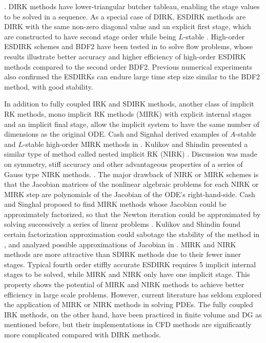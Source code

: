 \cite{wang2017compact_VR}.
DIRK methods have lower-triangular butcher tableau,
enabling the stage values to be solved in a sequence.
As a special case of DIRK,
ESDIRK methods are DIRK with the same non-zero diagonal value
and an explicit first stage,
which are constructed to have
second stage order while being $L$-stable
\cite{kennedy2003additiveARK,kvaerno2004singly}.
High-order ESDIRK schemes and
BDF2 have been tested in
\cite{bijl2002implicitBDFvESDIRK,wang2007implicitDGTests}
to solve flow problems,
whose results illustrate
better accuracy and higher efficiency
of high-order ESDIRK methods
compared to the second order BDF2.
Previous numerical experiments also confirmed
the ESDIRKs can endure large time step size similar to the BDF2 method,
with good stability.


In addition to fully coupled IRK and SDIRK methods,
another class of implicit RK methods,
mono implicit RK methods (MIRK)
\cite{cash1975classMIRKOrig}
with explicit internal stages and
an implicit final stage,
allow the implicit system to
have the same number of dimensions
as the original ODE.
Cash and Signhal derived examples of
$A$-stable and $L$-stable high-order
MIRK methods in
\cite{cash1977clasMIRK1,cash1982monoMIRK2}.
Kulikov and Shindin presented a similar type
of method called nested implicit RK (NIRK)
\cite{kulikov2006familyNIRKOrig}.
Discussion was made on symmetry, stiff accuracy and
other advantageous properties of a series of Gauss type
NIRK methods.
\cite{kulikov2009adaptive}.
The major drawback of NIRK or MIRK schemes is that
the Jacobian matrices of the nonlinear algebraic problems
for each NIRK or MIRK step are
polynomials of the Jacobian of the ODE's right-hand-side.
Cash and Singhal proposed to find MIRK methods whose
Jacobian could be approximately factorized,
so that the Newton iteration
could be approximated by solving successively a series of linear
problems \cite{cash1982monoMIRK2}.
Kulikov and Shindin found certain factorization
approximation could sabotage the stability of
the method in
\cite{kulikov2009adaptive},
and analyzed possible approximations of
Jacobian in
\cite{kulikov2007asymptotic}.
MIRK and NIRK methods are more attractive than SDIRK methods
due to their fewer inner stages.
Typical fourth order
stiffly accurate ESDIRK requires 5 implicit internal stages to be
solved,
while MIRK and NIRK only have one implicit stage.
This property shows the potential of MIRK and NIRK methods to achieve better efficiency in
large scale problems.
However, current literature has seldom explored
the application of MIRK or NIRK methods in
solving PDEs.
The fully coupled IRK methods, on the other hand,
have been practiced in
finite volume \cite{jameson2017evaluation} and
DG \cite{pazner2017stage}
as mentioned before,
but their implementations
in CFD methods are significantly more
complicated compared with DIRK methods.

